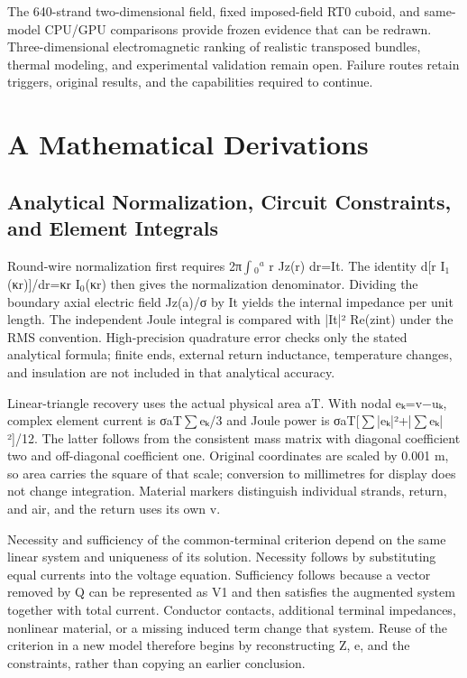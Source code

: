 \documentclass[11pt]{article}
\begin{document}
The 640-strand two-dimensional field, fixed imposed-field RT0 cuboid, and same-model CPU/GPU comparisons provide frozen evidence that can be redrawn. Three-dimensional electromagnetic ranking of realistic transposed bundles, thermal modeling, and experimental validation remain open. Failure routes retain triggers, original results, and the capabilities required to continue.


\FloatBarrier
\section*{A Mathematical Derivations}
\hypertarget{chapter-A}{}
\subsection*{Analytical Normalization, Circuit Constraints, and Element Integrals}
\hypertarget{A.report_derivation.heading}{}
Round-wire normalization first requires 2π\(\int\)\(_0\)\(^a\) r Jz(r) dr=It. The identity d[r I\(_1\)(κr)]/dr=κr I\(_0\)(κr) then gives the normalization denominator. Dividing the boundary axial electric field Jz(a)/σ by It yields the internal impedance per unit length. The independent Joule integral is compared with |It|² Re(zint) under the RMS convention. High-precision quadrature error checks only the stated analytical formula; finite ends, external return inductance, temperature changes, and insulation are not included in that analytical accuracy.


Linear-triangle recovery uses the actual physical area aT. With nodal eₖ=v−uₖ, complex element current is σaT\(\sum\)eₖ/3 and Joule power is σaT[\(\sum\)|eₖ|²+|\(\sum\)eₖ|²]/12. The latter follows from the consistent mass matrix with diagonal coefficient two and off-diagonal coefficient one. Original coordinates are scaled by 0.001 m, so area carries the square of that scale; conversion to millimetres for display does not change integration. Material markers distinguish individual strands, return, and air, and the return uses its own v.


Necessity and sufficiency of the common-terminal criterion depend on the same linear system and uniqueness of its solution. Necessity follows by substituting equal currents into the voltage equation. Sufficiency follows because a vector removed by Q can be represented as V1 and then satisfies the augmented system together with total current. Conductor contacts, additional terminal impedances, nonlinear material, or a missing induced term change that system. Reuse of the criterion in a new model therefore begins by reconstructing Z, e, and the constraints, rather than copying an earlier conclusion.
\end{document}
